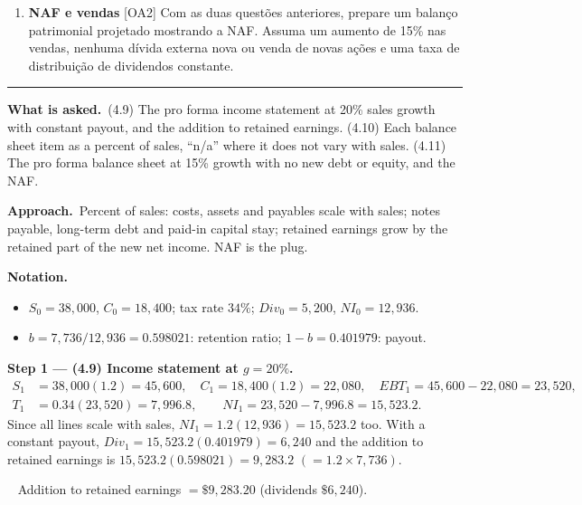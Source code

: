 \documentclass[11pt,a4paper]{article}
\newcommand{\notation}{\par\noindent\textbf{Notation.}}
\newcommand{\step}[2]{\par\medskip\noindent\textbf{Step #1 --- #2.}~}
\newcommand{\asked}{\par\medskip\noindent\textbf{What is asked.}~}
\newcommand{\approach}{\par\smallskip\noindent\textbf{Approach.}~}
\newcommand{\answer}[1]{\par\smallskip\noindent\fbox{\textbf{Answer #1.}}~}
\providecommand{\tightlist}{\setlength{\itemsep}{0pt}\setlength{\parskip}{0pt}}
\newcommand{\stmtend}{\par\endgroup\nopagebreak\noindent\rule{\linewidth}{0.4pt}\par\medskip}
\begin{document}
\begin{enumerate}
\def\labelenumi{\arabic{enumi}.}
\setcounter{enumi}{10}
\tightlist
\item
  \textbf{NAF e vendas} {[}OA2{]} Com as duas questões anteriores, prepare um balanço patrimonial
  projetado mostrando a NAF. Assuma um aumento de 15\% nas vendas, nenhuma dívida externa nova ou
  venda de novas ações e uma taxa de distribuição de dividendos constante.
\end{enumerate}
\stmtend

\asked (4.9) The pro forma income statement at 20\% sales growth with constant payout, and the addition
to retained earnings. (4.10) Each balance sheet item as a percent of sales, ``n/a'' where it does not
vary with sales. (4.11) The pro forma balance sheet at 15\% growth with no new debt or equity, and the NAF.

\approach Percent of sales: costs, assets and payables scale with sales; notes payable, long-term debt
and paid-in capital stay; retained earnings grow by the retained part of the new net income. NAF is the plug.

\notation
\begin{itemize}
  \item $S_0=38{,}000$, $C_0=18{,}400$; tax rate $34\%$; $Div_0=5{,}200$, $NI_0=12{,}936$.
  \item $b=7{,}736/12{,}936=0.598021$: retention ratio; $1-b=0.401979$: payout.
\end{itemize}

\step{1}{(4.9) Income statement at $g=20\%$}
\begin{align}
  S_1 &= 38{,}000(1.2) = 45{,}600, \quad C_1 = 18{,}400(1.2) = 22{,}080, \quad
  EBT_1 = 45{,}600-22{,}080 = 23{,}520, \nonumber\\
  T_1 &= 0.34(23{,}520) = 7{,}996.8, \qquad NI_1 = 23{,}520-7{,}996.8 = 15{,}523.2. \label{r2ce7-ni}
\end{align}
Since all lines scale with sales, $NI_1=1.2(12{,}936)=15{,}523.2$ too. With a constant payout,
$Div_1=15{,}523.2(0.401979)=6{,}240$ and the addition to retained earnings is
$15{,}523.2(0.598021)=9{,}283.2$ $(=1.2\times7{,}736)$.
\answer{(4.9)} Addition to retained earnings $=\$9{,}283.20$ (dividends $\$6{,}240$).
\end{document}
